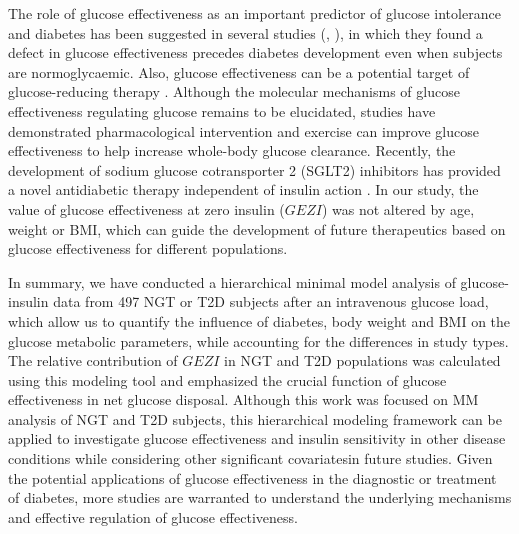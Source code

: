 \documentclass[utf8]{frontiersSCNS} %
\begin{document}
The role of glucose effectiveness as an important predictor of glucose intolerance and diabetes has been suggested in several studies (\citet{Martin1992}, \citet{lorenzo_2010}), in which they found a defect in glucose effectiveness precedes diabetes development even when subjects are normoglycaemic. Also, glucose effectiveness can be a potential target of glucose-reducing therapy \citep{Ahren_2020}. Although the molecular mechanisms of glucose effectiveness regulating glucose remains to be elucidated, studies have demonstrated pharmacological intervention \citep{pau_2014} and exercise \citep{kar_2017} can improve glucose effectiveness to help increase whole-body glucose clearance. Recently, the development of sodium glucose cotransporter 2 (SGLT2) inhibitors has provided a novel antidiabetic therapy independent of insulin action \citep{SGLT2_2015}. In our study, the value of glucose effectiveness at zero insulin ($GEZI$) was not altered by age, weight or BMI, which can guide the development of future therapeutics based on glucose effectiveness for different populations. 

In summary, we have conducted a hierarchical minimal model analysis of glucose-insulin data from 497 NGT or T2D subjects after an intravenous glucose load, which allow us to quantify the influence of diabetes, body weight and BMI on the glucose metabolic parameters, while accounting for the differences in study types. The relative contribution of $GEZI$ in NGT and T2D populations was calculated using this modeling tool and emphasized the crucial function of glucose effectiveness in net glucose disposal. Although this work was focused on MM analysis of NGT and T2D subjects, this hierarchical modeling framework can be applied to investigate glucose effectiveness and insulin sensitivity in other disease conditions while considering other significant covariatesin future studies. Given the potential applications of glucose effectiveness in the diagnostic or treatment of diabetes, more studies are warranted to understand the underlying mechanisms and effective regulation of glucose effectiveness.  
\end{document}
